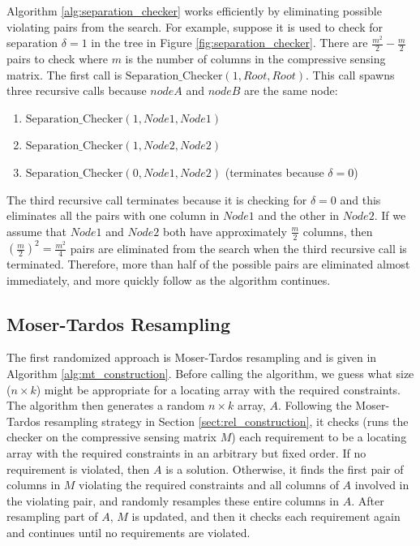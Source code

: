 Algorithm \ref{alg:separation_checker} works efficiently by eliminating possible violating pairs from the search.
For example, suppose it is used to check for separation $\delta = 1$ in the tree in Figure \ref{fig:separation_checker}.
There are $\frac{m^2}{2}-\frac{m}{2}$ pairs to check where $m$ is the number of columns in the compressive sensing matrix.
The first call is $\mathrm{Separation\_Checker}(1,\mathit{Root},\mathit{Root})$.
This call spawns three recursive calls because $\mathit{nodeA}$ and $\mathit{nodeB}$ are the same node:
\begin{enumerate}
\item $\mathrm{Separation\_Checker}(1,\mathit{Node1},\mathit{Node1})$
\item $\mathrm{Separation\_Checker}(1,\mathit{Node2},\mathit{Node2})$
\item $\mathrm{Separation\_Checker}(0,\mathit{Node1},\mathit{Node2})$ (terminates because $\delta = 0$)
\end{enumerate}
The third recursive call terminates because it is checking for $\delta = 0$ and this eliminates all the pairs with one column in $\mathit{Node1}$ and the other in $\mathit{Node2}$.
If we assume that $\mathit{Node1}$ and $\mathit{Node2}$ both have approximately $\frac{m}{2}$ columns, then ${(\frac{m}{2})}^2 = \frac{m^2}{4}$ pairs are eliminated from the search when the third recursive call is terminated.
Therefore, more than half of the possible pairs are eliminated almost immediately, and more quickly follow as the algorithm continues.

\subsection{Moser-Tardos Resampling} \label{sect:pure}

The first randomized approach is Moser-Tardos resampling and is given in Algorithm \ref{alg:mt_construction}.
Before calling the algorithm, we guess what size ($n \times k$) might be appropriate for a locating array with the required constraints.
The algorithm then generates a random $n \times k$ array, $A$.
Following the Moser-Tardos resampling strategy in Section \ref{sect:rel_construction}, it checks (runs the checker on the compressive sensing matrix $M$) each requirement to be a locating array with the required constraints in an arbitrary but fixed order.
If no requirement is violated, then $A$ is a solution.
Otherwise, it finds the first pair of columns in $M$ violating the required constraints and all columns of $A$ involved in the violating pair, and randomly resamples these entire columns in $A$.
After resampling part of $A$, $M$ is updated, and then it checks each requirement again and continues until no requirements are violated.


